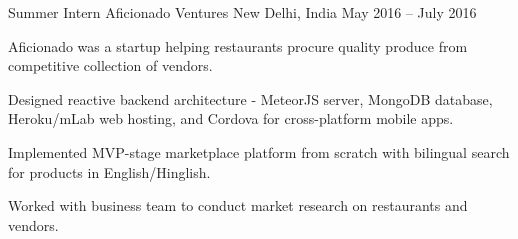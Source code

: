 \begin{cvexperience}
\cvposition
	{Summer Intern} %
	{Aficionado Ventures} %
	{} %
	{New Delhi, India} %
	{May 2016 -- July 2016} %
	{\begin{cvitems} %
		\item {Aficionado was a startup helping restaurants procure quality produce from competitive collection of vendors.}
		\item {Designed reactive backend architecture - MeteorJS server, MongoDB database, Heroku/mLab web hosting, and Cordova for cross-platform mobile apps.}
		\item {Implemented MVP-stage marketplace platform from scratch with bilingual search for products in English/Hinglish.}
		\item {Worked with business team to conduct market research on restaurants and vendors.}
	\end{cvitems}}

\end{cvexperience}

